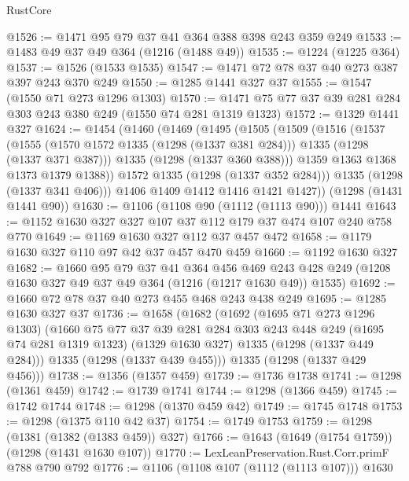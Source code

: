 \begin{lexlean}{RustCore}
\begin{coremodule}
@1526 := @1471 @95 @79 @37 @41 @364 @388 @398 @243 @359 @249
@1533 := @1483 @49 @37 @49 @364 (@1216 (@1488 @49))
@1535 := @1224 (@1225 @364)
@1537 := @1526 (@1533 @1535)
@1547 := @1471 @72 @78 @37 @40 @273 @387 @397 @243 @370 @249
@1550 := @1285 @1441 @327 @37
@1555 := @1547 (@1550 @71 @273 @1296 @1303)
@1570 := @1471 @75 @77 @37 @39 @281 @284 @303 @243 @380 @249 (@1550 @74 @281 @1319 @1323)
@1572 := @1329 @1441 @327
@1624 := @1454
    (@1460
      (@1469
        (@1495
          (@1505
            (@1509
              (@1516
                (@1537
                  (@1555
                    (@1570 @1572 @1335 (@1298 (@1337 @381 @284)))
                    @1335
                    (@1298 (@1337 @371 @387)))
                  @1335
                  (@1298 (@1337 @360 @388)))
                @1359
                @1363
                @1368
                @1373
                @1379
                @1388))
            @1572
            @1335
            (@1298 (@1337 @352 @284)))
          @1335
          (@1298 (@1337 @341 @406)))
        @1406
        @1409
        @1412
        @1416
        @1421
        @1427))
    (@1298 (@1431 @1441 @90))
@1630 := @1106 (@1108 @90 (@1112 (@1113 @90))) @1441
@1643 := @1152 @1630 @327 @327 @107 @37 @112 @179 @37 @474 @107 @240 @758 @770
@1649 := @1169 @1630 @327 @112 @37 @457 @472
@1658 := @1179 @1630 @327 @110 @97 @42 @37 @457 @470 @459
@1660 := @1192 @1630 @327
@1682 := @1660
    @95
    @79
    @37
    @41
    @364
    @456
    @469
    @243
    @428
    @249
    (@1208 @1630 @327 @49 @37 @49 @364 (@1216 (@1217 @1630 @49)) @1535)
@1692 := @1660 @72 @78 @37 @40 @273 @455 @468 @243 @438 @249
@1695 := @1285 @1630 @327 @37
@1736 := @1658
    (@1682
      (@1692
        (@1695 @71 @273 @1296 @1303)
        (@1660
          @75
          @77
          @37
          @39
          @281
          @284
          @303
          @243
          @448
          @249
          (@1695 @74 @281 @1319 @1323)
          (@1329 @1630 @327)
          @1335
          (@1298 (@1337 @449 @284)))
        @1335
        (@1298 (@1337 @439 @455)))
      @1335
      (@1298 (@1337 @429 @456)))
@1738 := @1356 (@1357 @459)
@1739 := @1736 @1738
@1741 := @1298 (@1361 @459)
@1742 := @1739 @1741
@1744 := @1298 (@1366 @459)
@1745 := @1742 @1744
@1748 := @1298 (@1370 @459 @42)
@1749 := @1745 @1748
@1753 := @1298 (@1375 @110 @42 @37)
@1754 := @1749 @1753
@1759 := @1298 (@1381 (@1382 (@1383 @459)) @327)
@1766 := @1643 (@1649 (@1754 @1759)) (@1298 (@1431 @1630 @107))
@1770 := LexLeanPreservation.Rust.Corr.primF @788 @790 @792
@1776 := @1106 (@1108 @107 (@1112 (@1113 @107))) @1630

\end{coremodule}
\end{lexlean}

